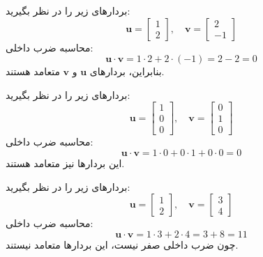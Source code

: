 \begin{example}
	بردارهای زیر را در نظر بگیرید:
	\[
	\mathbf{u} = \begin{bmatrix} 1 \\ 2 \end{bmatrix}, \quad \mathbf{v} = \begin{bmatrix} 2 \\ -1 \end{bmatrix}
	\]
	محاسبه ضرب داخلی:
	\[
	\mathbf{u} \cdot \mathbf{v} = 1 \cdot 2 + 2 \cdot (-1) = 2 - 2 = 0
	\]
	بنابراین، بردارهای \( \mathbf{u} \) و \( \mathbf{v} \) متعامد هستند.
\end{example}
\begin{example}
	بردارهای زیر را در نظر بگیرید:
	\[
	\mathbf{u} = \begin{bmatrix} 1 \\ 0 \\ 0 \end{bmatrix}, \quad \mathbf{v} = \begin{bmatrix} 0 \\ 1 \\ 0 \end{bmatrix}
	\]
	محاسبه ضرب داخلی:
	\[
	\mathbf{u} \cdot \mathbf{v} = 1 \cdot 0 + 0 \cdot 1 + 0 \cdot 0 = 0
	\]
	این بردارها نیز متعامد هستند.
\end{example}
\begin{example}
	بردارهای زیر را در نظر بگیرید:
	\[
	\mathbf{u} = \begin{bmatrix} 1 \\ 2 \end{bmatrix}, \quad \mathbf{v} = \begin{bmatrix} 3 \\ 4 \end{bmatrix}
	\]
	محاسبه ضرب داخلی:
	\[
	\mathbf{u} \cdot \mathbf{v} = 1 \cdot 3 + 2 \cdot 4 = 3 + 8 = 11
	\]
	چون ضرب داخلی صفر نیست، این بردارها متعامد نیستند.
\end{example}
